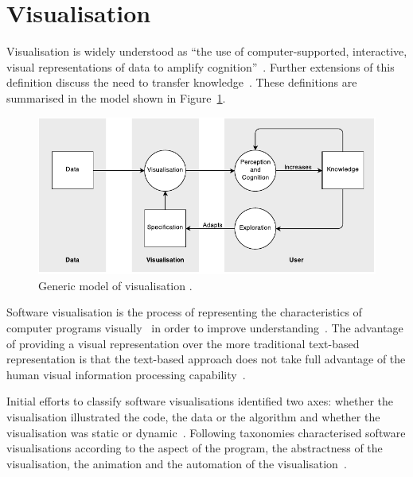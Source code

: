 \section{Visualisation}

Visualisation is widely understood as ``the use of computer-supported, interactive, visual representations of data to amplify cognition''~\cite{Card1999}. Further extensions of this definition discuss the need to transfer knowledge~\cite{Burkhard}. These definitions are summarised in the model shown in Figure~\ref{fig:model-of-visualisation}.

\begin{figure}
  \centering \includegraphics[width=\columnwidth]{../images/diagrams/wijk-model-of-visualisation.pdf}
  \caption{Generic model of visualisation \protect\cite{VanWijk2005}.}
\label{fig:model-of-visualisation}
\end{figure} 


Software visualisation is the process of representing the characteristics of computer programs visually~\cite{Stasko1992} in order to improve understanding~\cite{Diehl2007}. The advantage of providing a visual representation over the more traditional text-based representation is that the text-based approach does not take full advantage of the human visual information processing capability~\cite{Myers1989}.

Initial efforts to classify software visualisations identified two axes: whether the visualisation illustrated the code, the data or the algorithm and whether the visualisation was static or dynamic~\cite{Myers1989}. Following taxonomies characterised software visualisations according to the aspect of the program, the abstractness of the visualisation, the animation and the automation of the visualisation~\cite{Stasko1992}.

